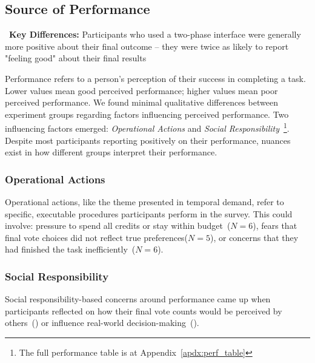 

\subsection{Source of Performance}
\label{sec:performance}

\begin{tldrbox}
   \faKey~\textbf{Key Differences:} Participants who used a two-phase interface were generally more positive about their final outcome -- they were twice as likely to report "feeling good" about their final results
\end{tldrbox}

Performance refers to a person's perception of their success in completing a task. Lower values mean good perceived performance; higher values mean poor perceived performance. We found minimal qualitative differences between experiment groups regarding factors influencing perceived performance. Two influencing factors emerged: \textit{Operational Actions} and \textit{Social Responsibility}~\footnote{The full performance table is at Appendix~\ref{apdx:perf_table}}. Despite most participants reporting positively on their performance, nuances exist in how different groups interpret their performance.

\subsubsection{Operational Actions}
Operational actions, like the theme presented in temporal demand, refer to specific, executable procedures participants perform in the survey. This could involve: pressure to spend all credits or stay within budget~($N=6$), fears that final vote choices did not reflect true preferences($N=5$), or concerns that they had finished the task inefficiently~($N=6$).

\subsubsection{Social Responsibility}
Social responsibility-based concerns around performance came up when participants reflected on how their final vote counts would be perceived by others~() or influence real-world decision-making~().

